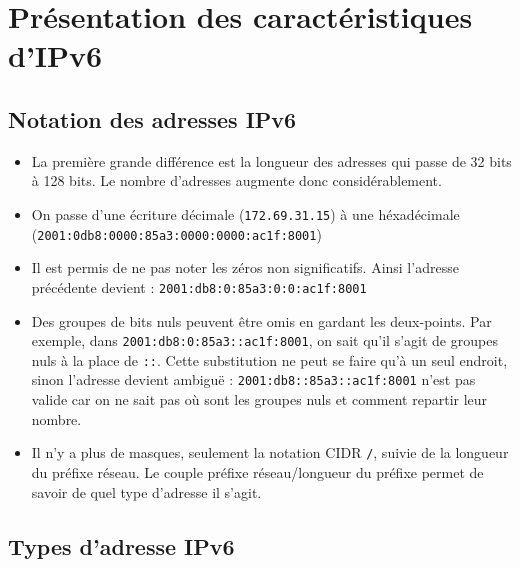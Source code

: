 \section{Présentation des caractéristiques d’IPv6}
\subsection{Notation des adresses IPv6}
  
\begin{itemize}
\item La première grande différence est la longueur des adresses qui passe de 32 bits à 128 bits. Le nombre d’adresses augmente donc considérablement.
\item On passe d’une écriture décimale (\texttt{172.69.31.15}) à une héxadécimale (\texttt{2001:0db8:0000:85a3:0000:0000:ac1f:8001})
\item Il est permis de ne pas noter les zéros non significatifs. Ainsi l'adresse précédente devient : \texttt{2001:db8:0:85a3:0:0:ac1f:8001}
\item Des groupes de bits nuls peuvent être omis en gardant les deux-points. Par exemple, dans \texttt{2001:db8:0:85a3::ac1f:8001}, on sait qu'il s’agit de groupes nuls à la place de \texttt{::}. Cette substitution ne peut se faire qu’à un seul endroit, sinon l’adresse devient ambiguë : \texttt{2001:db8::85a3::ac1f:8001} n'est pas valide car on ne sait pas où sont les groupes nuls et comment repartir leur nombre.
\item Il n’y a plus de masques, seulement la notation CIDR \texttt{/}, suivie de la longueur du préfixe réseau. Le couple préfixe réseau/longueur du préfixe permet de savoir de quel type d’adresse il s’agit.
\end{itemize}

\subsection{Types d’adresse IPv6}

